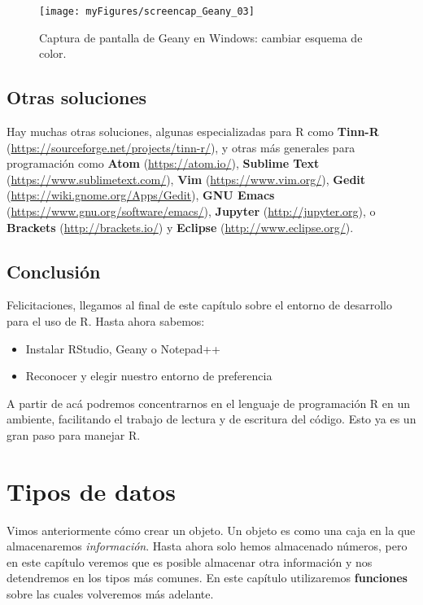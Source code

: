 \documentclass[
]{book}
\providecommand{\tightlist}{%
  \setlength{\itemsep}{0pt}\setlength{\parskip}{0pt}}
\begin{document}
\begin{figure}
\texttt{[image: myFigures/screencap\_Geany\_03]} \caption{Captura de pantalla de Geany en Windows: cambiar esquema de color.\label{fig:screenCapGeany03}}\label{fig:screenCapGeany03}
\end{figure}

\hypertarget{otras-soluciones}{%
\section{Otras soluciones}\label{otras-soluciones}}

Hay muchas otras soluciones, algunas especializadas para R como \textbf{Tinn-R} (\url{https://sourceforge.net/projects/tinn-r/}), y otras más generales para programación como \textbf{Atom} (\url{https://atom.io/}), \textbf{Sublime Text} (\url{https://www.sublimetext.com/}), \textbf{Vim} (\url{https://www.vim.org/}), \textbf{Gedit} (\url{https://wiki.gnome.org/Apps/Gedit}), \textbf{GNU Emacs} (\url{https://www.gnu.org/software/emacs/}), \textbf{Jupyter} (\url{http://jupyter.org}), o \textbf{Brackets} (\url{http://brackets.io/}) y \textbf{Eclipse} (\url{http://www.eclipse.org/}).

\hypertarget{conclusiuxf3n-1}{%
\section{Conclusión}\label{conclusiuxf3n-1}}

Felicitaciones, llegamos al final de este capítulo sobre el entorno de desarrollo para el uso de R. Hasta ahora sabemos:

\begin{itemize}
\tightlist
\item
  Instalar RStudio, Geany o Notepad++
\item
  Reconocer y elegir nuestro entorno de preferencia
\end{itemize}

A partir de acá podremos concentrarnos en el lenguaje de programación R en un ambiente, facilitando el trabajo de lectura y de escritura del código. Esto ya es un gran paso para manejar R.

\hypertarget{dataType1}{%
\chapter{Tipos de datos}\label{dataType1}}

Vimos anteriormente cómo crear un objeto. Un objeto es como una caja en la que almacenaremos \emph{información}. Hasta ahora solo hemos almacenado números, pero en este capítulo veremos que es posible almacenar otra información y nos detendremos en los tipos más comunes. En este capítulo utilizaremos \textbf{funciones} sobre las cuales volveremos más adelante.
\end{document}
